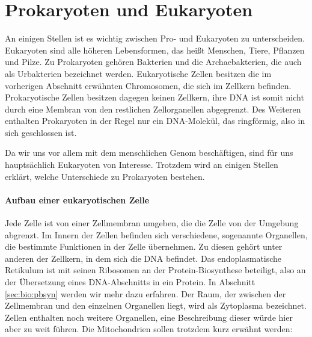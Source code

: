 \section{Prokaryoten und Eukaryoten}
\label{sec:bio:proeukaryoten}

An einigen Stellen ist es wichtig zwischen Pro- und Eukaryoten zu unterscheiden. Eukaryoten sind alle höheren Lebensformen, das heißt Menschen, Tiere, Pflanzen und Pilze. Zu Prokaryoten gehören Bakterien und die Archaebakterien, die auch als Urbakterien bezeichnet werden. Eukaryotische Zellen besitzen die im vorherigen Abschnitt erwähnten Chromosomen, die sich im Zellkern befinden. Prokaryotische Zellen besitzen dagegen keinen Zellkern, ihre DNA ist somit nicht durch eine Membran von den restlichen Zellorganellen abgegrenzt. Des Weiteren enthalten Prokaryoten in der Regel nur ein DNA-Molekül, das ringförmig, also in sich geschlossen ist. 

Da wir uns vor allem mit dem menschlichen Genom beschäftigen, sind für uns hauptsächlich Eukaryoten von Interesse. Trotzdem wird an einigen Stellen erklärt, welche Unterschiede zu Prokaryoten bestehen.

\paragraph{Aufbau einer eukaryotischen Zelle}

Jede Zelle ist von einer Zellmembran umgeben, die die Zelle von der Umgebung abgrenzt. Im Innern der Zellen befinden sich verschiedene, sogenannte Organellen, die bestimmte Funktionen in der Zelle übernehmen. Zu diesen gehört unter anderen der Zellkern, in dem sich die DNA befindet. Das endoplasmatische Retikulum ist mit seinen Ribosomen an der Protein-Biosynthese beteiligt, also an der Übersetzung eines DNA-Abschnitts in ein Protein. In Abschnitt \ref{sec:bio:pbsyn} werden wir mehr dazu erfahren. Der Raum, der zwischen der Zellmembran und den einzelnen Organellen liegt, wird als Zytoplasma bezeichnet. Zellen enthalten noch weitere Organellen, eine Beschreibung dieser würde hier aber zu weit führen. Die Mitochondrien sollen trotzdem kurz erwähnt werden:

